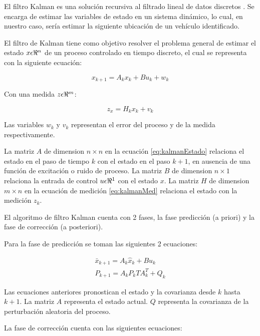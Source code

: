 El filtro Kalman es una solución recursiva al filtrado lineal de datos discretos \cite{welch1995introduction}. Se encarga de estimar las variables de estado en un sistema dinámico, lo cual, en nuestro caso, sería estimar la siguiente ubicación de un vehículo identificado.

El filtro de Kalman tiene como objetivo resolver el problema general de estimar el estado $x \space \epsilon \space \Re^{n}$ de un proceso controlado en tiempo discreto, el cual se representa con la siguiente ecuación:

\begin{equation}
\label{eq:kalmanEstado}
    x_{k+1} = A_kx_k + Bu_k + w_k
\end{equation}

Con una medida $z \space \epsilon \space \Re^{m}$:

\begin{equation}
\label{eq:kalmanMed}
    z_x = H_kx_k + v_k
\end{equation}

Las variables $w_k$ y $v_k$ representan el error del proceso y de la medida respectivamente.

La matriz $A$  de dimension $n\times{}n$ en la ecuación \eqref{eq:kalmanEstado} relaciona el estado en el paso de tiempo $k$ con el estado en el paso $k + 1$, en ausencia de una función de excitación o ruido de proceso. La matriz $B$ de dimension $n\times{}1$ relaciona la entrada de control $u \space \epsilon \Re^{1}$ con el estado $x$. La matriz $H$ de dimension $m\times{}n$ en la ecuación de medición \eqref{eq:kalmanMed} relaciona el estado con la medición $z_k$.

El algoritmo de filtro Kalman cuenta con 2 fases, la fase predicción (a priori) y la fase de corrección (a posteriori).

Para la fase de predicción se toman las siguientes 2 ecuaciones:

\begin{eqnarray}
    \label{eq:kalmanActUno}
    \bar{x}_{k+1} = A_k\hat{x}_k + Bu_k\\
    \label{eq:kalmanActDos}
    P_{k+1} = A_kP_kTA^{T}_k + Q_k
\end{eqnarray}


Las ecuaciones anteriores pronostican el estado y la covarianza desde $k$ hasta $k+1$. La matriz $A$ representa el estado actual. $Q$ representa la covarianza de la perturbación aleatoria del proceso.

La fase de corrección cuenta con las siguientes ecuaciones:

